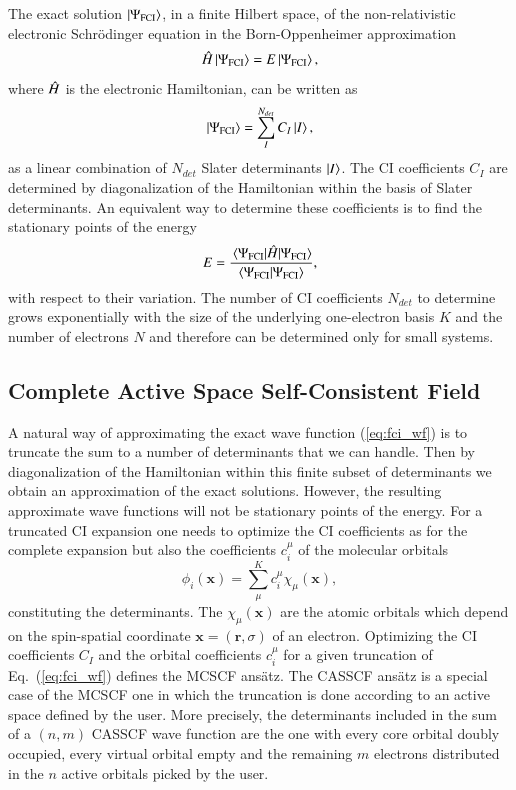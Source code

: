 \documentclass[aip,jcp,reprint,noshowkeys,superscriptaddress]{revtex4-1}
\begin{document}
The exact solution $\ket{\Psi_{\text{FCI}}}$, in a finite Hilbert space, of the non-relativistic electronic Schr\"odinger equation in the Born-Oppenheimer approximation
\begin{equation}
  \label{eq:schro_eq}
  \Hat{H} \ket{\Psi_{\text{FCI}}} = E \ket{\Psi_{\text{FCI}}},
\end{equation}
where $\Hat{H}$ is the electronic Hamiltonian, can be written as \cite{Szabo_1996}
\begin{equation}
  \label{eq:fci_wf}
  \ket{\Psi_{\text{FCI}}} = \sum_I^{N_{det}} C_I\ket{I},
\end{equation}
\ie as a linear combination of $N_{det}$ Slater determinants $\ket{I}$.
The CI coefficients $C_I$ are determined by diagonalization of the Hamiltonian within the basis of Slater determinants.
An equivalent way to determine these coefficients is to find the stationary points of the energy
\begin{equation}
  \label{eq:fci_nrj}
  E = \frac{\mel{\Psi_{\text{FCI}}}{\Hat{H}}{\Psi_{\text{FCI}}}}{\braket{\Psi_{\text{FCI}}}{\Psi_{\text{FCI}}}},
\end{equation}
 with respect to their variation.
The number of CI coefficients $N_{det}$ to determine grows exponentially with the size of the underlying one-electron basis $K$ and the number of electrons $N$ and therefore can be determined only for small systems.

\subsection{Complete Active Space Self-Consistent Field}
\label{subsec:CASSCF}

A natural way of approximating the exact wave function (\ref{eq:fci_wf}) is to truncate the sum to a number of determinants that we can handle. Then by diagonalization of the Hamiltonian within this finite subset of determinants we obtain an approximation of the exact solutions.
However, the resulting approximate wave functions will not be stationary points of the energy.
For a truncated CI expansion one needs to optimize the CI coefficients as for the complete expansion but also the coefficients $c_i^\mu$ of the molecular orbitals
\begin{equation}
  \label{eq:mo}
  \phi_i(\bm{x}) = \sum^K_\mu c_i^\mu \chi_{\mu}(\bm{x}),
\end{equation}
constituting the determinants. The $\chi_{\mu}(\bm{x})$ are the atomic orbitals which depend on the spin-spatial coordinate $\bm{x} = (\bm{r},\sigma)$ of an electron.
Optimizing the CI coefficients $C_I$ and the orbital coefficients $c_i^\mu$ for a given truncation of Eq.~(\ref{eq:fci_wf}) defines the MCSCF ans\"atz.
The CASSCF ans\"atz is a special case of the MCSCF one in which the truncation is done according to an active space defined by the user.
More precisely, the determinants included in the sum of a $(n,m)$ CASSCF wave function are the one with every core orbital doubly occupied, every virtual orbital empty and the remaining $m$ electrons distributed in the $n$ active orbitals picked by the user.
\end{document}
